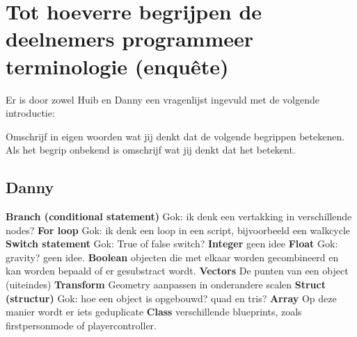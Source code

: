 \section[Enquête]{Tot hoeverre begrijpen de deelnemers programmeer terminologie (enquête)}
\label{appendix:oreintatieintervieuw:enquete}
Er is door zowel Huib en Danny een vragenlijst ingevuld met de volgende introductie:

Omschrijf in eigen woorden wat jij denkt dat de volgende begrippen betekenen. Als het begrip onbekend is omschrijf wat jij denkt dat het betekent.

\subsection*{Danny}
\textbf{Branch (conditional statement)} \newline
Gok: ik denk een vertakking in verschillende nodes? \newline
\textbf{For loop} \newline
Gok: ik denk een loop in een script, bijvoorbeeld een walkcycle \newline
\textbf{Switch statement} \newline
Gok: True of false switch? \newline
\textbf{Integer} \newline
geen idee \newline
\textbf{Float} \newline
Gok: gravity? geen idee. \newline
\textbf{Boolean} \newline
objecten die met elkaar worden gecombineerd en kan worden bepaald of er gesubstract wordt. \newline
\textbf{Vectors} \newline
De punten van een object (uiteindes) \newline
\textbf{Transform} \newline
Geometry aanpassen in onderandere scalen \newline
\textbf{Struct (structur)} \newline
Gok: hoe een object is opgebouwd? quad en tris? \newline
\textbf{Array} \newline
Op deze manier wordt er iets geduplicate \newline
\textbf{Class} \newline
verschillende blueprints, zoals firstpersonmode of playercontroller. \newline
